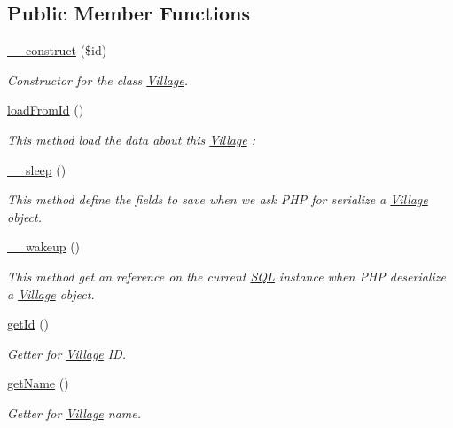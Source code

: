 \subsection*{Public Member Functions}
\begin{DoxyCompactItemize}
\item 
\mbox{\hyperlink{classVillage_a2e242983f34bdede6730316edccfa988}{\+\_\+\+\_\+construct}} (\$id)
\begin{DoxyCompactList}\small\item\em Constructor for the class \mbox{\hyperlink{classVillage}{Village}}. \end{DoxyCompactList}\item 
\mbox{\hyperlink{classVillage_a32709e6efc8c58dcedea9727cfa44973}{load\+From\+Id}} ()
\begin{DoxyCompactList}\small\item\em This method load the data about this \mbox{\hyperlink{classVillage}{Village}} \+: \end{DoxyCompactList}\item 
\mbox{\hyperlink{classVillage_a0bea180246dc3d1d6916cf295f57cb7a}{\+\_\+\+\_\+sleep}} ()
\begin{DoxyCompactList}\small\item\em This method define the fields to save when we ask P\+HP for serialize a \mbox{\hyperlink{classVillage}{Village}} object. \end{DoxyCompactList}\item 
\mbox{\label{classVillage_a0ab7b982773c3eb1b10a7ed314b87c42}} 
\mbox{\hyperlink{classVillage_a0ab7b982773c3eb1b10a7ed314b87c42}{\+\_\+\+\_\+wakeup}} ()
\begin{DoxyCompactList}\small\item\em This method get an reference on the current \mbox{\hyperlink{classSQL}{S\+QL}} instance when P\+HP deserialize a \mbox{\hyperlink{classVillage}{Village}} object. \end{DoxyCompactList}\item 
\mbox{\hyperlink{classVillage_a5729e2071e18f7cd31bb65b771d51a59}{get\+Id}} ()
\begin{DoxyCompactList}\small\item\em Getter for \mbox{\hyperlink{classVillage}{Village}} ID. \end{DoxyCompactList}\item 
\mbox{\hyperlink{classVillage_a42259e980f432193138a5cad1d48866f}{get\+Name}} ()
\begin{DoxyCompactList}\small\item\em Getter for \mbox{\hyperlink{classVillage}{Village}} name. \end{DoxyCompactList}\item 

\end{DoxyCompactItemize}
